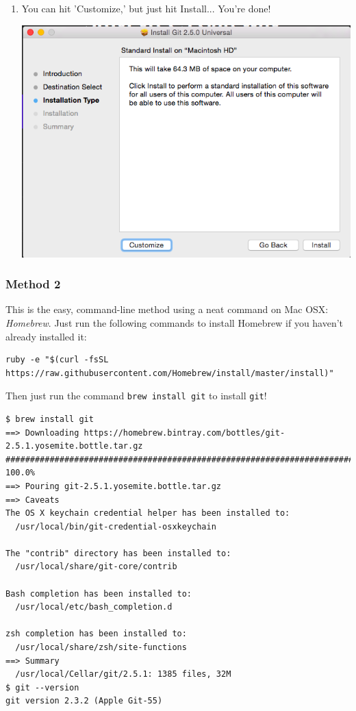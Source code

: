 \documentclass[11pt,fleqn]{article}
\theoremstyle{definition}
\begin{document}
\begin{enumerate}[Step 1.]
\item You can hit 'Customize,' but just hit Install... You're done!
\begin{center}
\includegraphics[scale=0.5]{gitmacinstall3.png}
\end{center}
\end{enumerate}

\newpage
\subsubsection{Method 2}
This is the easy, command-line method using a neat command on Mac OSX: \textit{Homebrew}. Just run the following commands to install Homebrew if you haven't already installed it:

\begin{center}
\begin{verbatim}
ruby -e "$(curl -fsSL https://raw.githubusercontent.com/Homebrew/install/master/install)"
\end{verbatim}
\end{center}

Then just run the command \verb|brew install git| to install \texttt{git}!

\begin{verbatim}
$ brew install git
==> Downloading https://homebrew.bintray.com/bottles/git-2.5.1.yosemite.bottle.tar.gz
######################################################################## 100.0%
==> Pouring git-2.5.1.yosemite.bottle.tar.gz
==> Caveats
The OS X keychain credential helper has been installed to:
  /usr/local/bin/git-credential-osxkeychain

The "contrib" directory has been installed to:
  /usr/local/share/git-core/contrib

Bash completion has been installed to:
  /usr/local/etc/bash_completion.d

zsh completion has been installed to:
  /usr/local/share/zsh/site-functions
==> Summary
  /usr/local/Cellar/git/2.5.1: 1385 files, 32M
$ git --version
git version 2.3.2 (Apple Git-55)
\end{verbatim}
\end{document}
